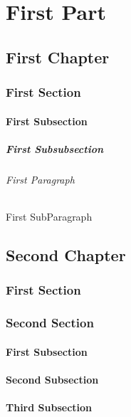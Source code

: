 ﻿\documentclass{report}
\begin{document}
\part{First Part}
\chapter{First Chapter}
\section{First Section}
\subsection{First Subsection}
\subsubsection{First Subsubsection}
\paragraph{First Paragraph}
\subparagraph{First SubParagraph}
\chapter{Second Chapter}
\section{First Section}
\section{Second Section}
\subsection{First Subsection}
\subsection{Second Subsection}
\subsection{Third Subsection}
\end{document}
